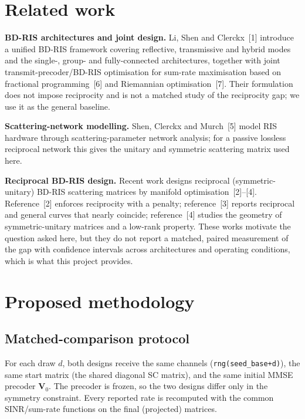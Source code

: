 \documentclass[10pt,a4paper]{article}
\begin{document}
\section{Related work}
\textbf{BD-RIS architectures and joint design.} Li, Shen and Clerckx~[1] introduce a unified BD-RIS framework covering reflective, transmissive and hybrid modes and the single-, group- and fully-connected architectures, together with joint transmit-precoder/BD-RIS optimisation for sum-rate maximisation based on fractional programming~[6] and Riemannian optimisation~[7]. Their formulation does not impose reciprocity and is not a matched study of the reciprocity gap; we use it as the general baseline.

\textbf{Scattering-network modelling.} Shen, Clerckx and Murch~[5] model RIS hardware through scattering-parameter network analysis; for a passive lossless reciprocal network this gives the unitary and symmetric scattering matrix used here.

\textbf{Reciprocal BD-RIS design.} Recent work designs reciprocal (symmetric-unitary) BD-RIS scattering matrices by manifold optimisation~[2]--[4]. Reference~[2] enforces reciprocity with a penalty; reference~[3] reports reciprocal and general curves that nearly coincide; reference~[4] studies the geometry of symmetric-unitary matrices and a low-rank property. These works motivate the question asked here, but they do not report a matched, paired measurement of the gap with confidence intervals across architectures and operating conditions, which is what this project provides.

\section{Proposed methodology}
\subsection{Matched-comparison protocol}
For each draw $d$, both designs receive the same channels (\texttt{rng(seed\_base+d)}), the same start matrix (the shared diagonal SC matrix), and the same initial MMSE precoder $\mathbf V_0$. The precoder is frozen, so the two designs differ only in the symmetry constraint. Every reported rate is recomputed with the common SINR/sum-rate functions on the final (projected) matrices.
\end{document}
